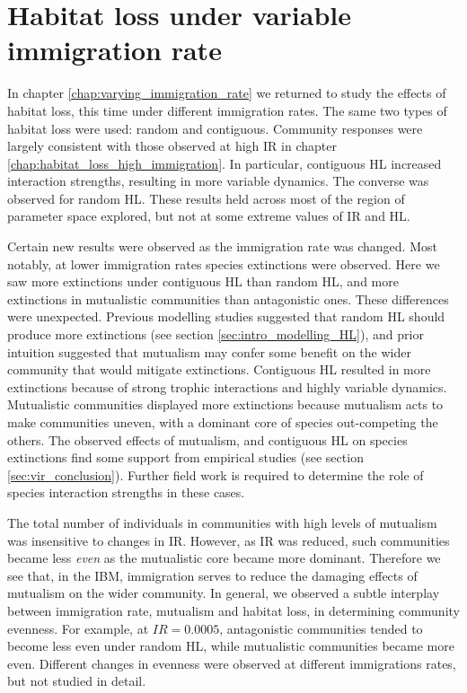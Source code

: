 \section{Habitat loss under variable immigration rate}
\label{sec:hl_var}

In chapter \ref{chap:varying_immigration_rate} we returned to study the effects of habitat loss, this time under different immigration rates. The same two types of habitat loss were used: random and contiguous. Community responses were largely consistent with those observed at high IR in chapter \ref{chap:habitat_loss_high_immigration}. In particular, contiguous HL increased interaction strengths, resulting in more variable dynamics. The converse was observed for random HL. These results held across most of the region of parameter space explored, but not at some extreme values of IR and HL. 

Certain new results were observed as the immigration rate was changed. Most notably, at lower immigration rates species extinctions were observed. Here we saw more extinctions under contiguous HL than random HL, and more extinctions in mutualistic communities than antagonistic ones. These differences were unexpected. Previous modelling studies suggested that random HL should produce more extinctions (see section \ref{sec:intro_modelling_HL}), and prior intuition suggested that mutualism may confer some benefit on the wider community that would mitigate extinctions. Contiguous HL resulted in more extinctions because of strong trophic interactions and highly variable dynamics. Mutualistic communities displayed more extinctions because mutualism acts to make communities uneven, with a dominant core of species out-competing the others. The observed effects of mutualism, and contiguous HL on species extinctions find some support from empirical studies (see section \ref{sec:vir_conclusion}). Further field work is required to determine the role of species interaction strengths in these cases.

The total number of individuals in communities with high levels of mutualism was insensitive to changes in IR. However, as IR was reduced, such communities became less \emph{even} as the mutualistic core became more dominant. Therefore we see that, in the IBM, immigration serves to reduce the damaging effects of mutualism on the wider community. In general, we observed a subtle interplay between immigration rate, mutualism and habitat loss, in determining community evenness. For example, at $IR=0.0005$, antagonistic communities tended to become less even under random HL, while mutualistic communities became more even. Different changes in evenness were observed at different immigrations rates, but not studied in detail.

